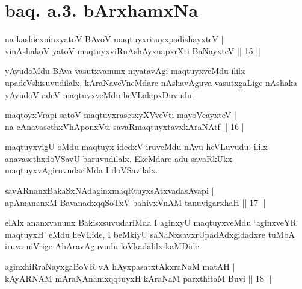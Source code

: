 \section*{baq. a.3. bArxhamxNa}


\begin{shl}
na kashicxninxyatoV BAvoV maqtuyxrituyxpadishayxteV |\\
vinAshakoV yatoV maqtuyxviRnAshAyxnapxrXti BaNayxteV \hfill || 15 ||
\end{shl}

\begin{artha}
yAvudoMdu BAva vasutxvanunx niyatavAgi maqtuyxveMdu ililx upadeVshisuvudilalx, 
kAraNaveVneMdare nAshavAguva vasutxgaLige nAshaka yAvudoV adeV maqtuyxveMdu heVLalapxDuvudu.
\end{artha}


\begin{shl}
maqtoyxVrapi satoV maqtuyxrasetxyXVveVti mayoVcayxteV |\\
na cAnavasethxVhA\s \s ponxVti savaRmaqtuyxtavxkAraNAtf \hfill || 16 ||
\end{shl}

\begin{artha}
maqtuyxvigU oMdu maqtuyx idedxV iruveMdu nAvu heVLuvudu. ililx anavasethxdoVSavU 
baruvudilalx. EkeMdare adu savaRkUkx maqtuyxvAgiruvudariMda I doVSavilalx.
\end{artha}

\begin{shl}
savARnanxBakaSxNAdaginxmaqRtuyxsAtxvadasAvapi |\\
apAmananxM BavanadxqqSoTxV bahivxVnAM tanuvigarxhaH \hfill || 17 ||
\end{shl}

\begin{artha}
elAlx ananxvanunx BakisxsuvudariMda I aginxyU maqtuyxveMdu `aginxveYR maqtuyxH'  eMdu heVLide, I 
beMkiyU saNaNxsavxrUpadAdxgidadxre tuMbA iruva niVrige AhAravAguvudu loVkadalilx kaMDide.
\end{artha}


\begin{shl}
aginxhiRraNayxgaBoVR vA hAyxpasatxtAkxraNaM matAH |\\
kAyARNAM mAraNAnamxqqtuyxH kAraNaM parxthitaM Buvi \hfill || 18 ||
\end{shl}

